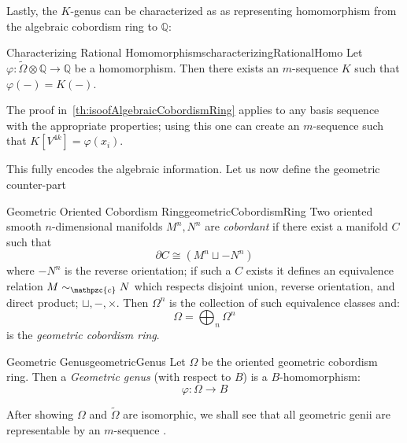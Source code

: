 \documentclass{book}
\newenvironment{Proof}[1][]
  {\begin{ProofTcb}[#1]}
  {\end{ProofTcb}}
\newcommand{\Q}{{\mathbb{Q}}}
\newcommand{\cc}{{\mathpzc{c}}}
\renewcommand{\phi}{\varphi}
\newcommand{\dcup}{\sqcup}
\begin{document}

Lastly, the $K$-genus can be characterized as as representing homomorphism from the algebraic cobordism ring to
$\Q$:

\begin{thm}{Characterizing Rational Homomorphisms}{characterizingRationalHomo}
  Let $\phi: \widetilde{\Omega}\otimes \Q \to \Q$ be a homomorphism. Then there exists an $m$-sequence $K$ such that
  $\phi(-) = K(-)$.
\end{thm}


\begin{Proof}
  The proof in~\cref{th:isoofAlgebraicCobordismRing} applies to any basis sequence with the appropriate
  properties; using this one can create an $m$-sequence such that $K[V^{4k}] = \phi(x_i)$.
\end{Proof}

This fully encodes the algebraic information. Let us now define the geometric counter-part

\begin{defn}{Geometric Oriented Cobordism Ring}{geometricCobordismRing}
  Two oriented smooth $n$-dimensional manifolds $M^n, N^n$ are \emph{cobordant} if there exist a manifold $C$ such that
  \[
    \partial C \cong (M^n \dcup  -N^n)
  \]
  where $-N^n$ is the reverse orientation; if such a $C$ exists it defines an equivalence relation $M\sim_\cc
  N$ which respects disjoint union, reverse orientation, and direct product; $\dcup, -, \times$. Then
  $\Omega^n$ is the collection of such equivalence classes and:
  \[
    \Omega = \bigoplus_n \Omega^n
  \]
  is the \emph{geometric cobordism ring}.
\end{defn}

\begin{defn}{Geometric Genus}{geometricGenus}
  Let $\Omega$ be the oriented geometric cobordism ring. Then a \emph{Geometric genus} (with respect to $B$)
  is a $B$-homomorphism:
  \[
    \phi: \Omega \to B
  \]
\end{defn}

After showing $\Omega$ and $\widetilde{\Omega}$ are isomorphic, we shall see that all geometric genii are
representable by an $m$-sequence .
\end{document}
